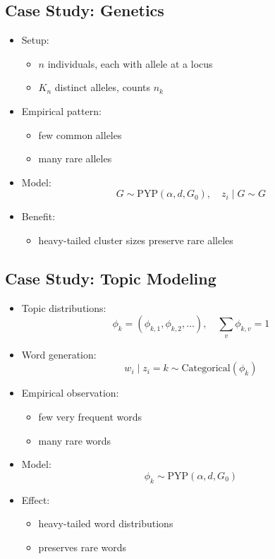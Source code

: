 \documentclass[12pt,oneside]{book}
\numberwithin{equation}{section}
\theoremstyle{definition}
\theoremstyle{plain}
\theoremstyle{remark}
\begin{document}
\subsection{Case Study: Genetics}

\begin{itemize}
\item Setup:
\begin{itemize}
\item $n$ individuals, each with allele at a locus
\item $K_n$ distinct alleles, counts $n_k$
\end{itemize}

\item Empirical pattern:
\begin{itemize}
\item few common alleles
\item many rare alleles
\end{itemize}

\item Model:
\[
G \sim \text{PYP}(\alpha, d, G_0), \quad z_i \mid G \sim G
\]

\item Benefit:
\begin{itemize}
\item heavy-tailed cluster sizes preserve rare alleles
\end{itemize}
\end{itemize}

\subsection{Case Study: Topic Modeling}

\begin{itemize}
\item Topic distributions:
\[
\phi_k = (\phi_{k,1}, \phi_{k,2}, \dots), \quad \sum_v \phi_{k,v} = 1
\]

\item Word generation:
\[
w_i \mid z_i = k \sim \text{Categorical}(\phi_k)
\]

\item Empirical observation:
\begin{itemize}
\item few very frequent words
\item many rare words
\end{itemize}

\item Model:
\[
\phi_k \sim \text{PYP}(\alpha, d, G_0)
\]

\item Effect:
\begin{itemize}
\item heavy-tailed word distributions
\item preserves rare words
\end{itemize}
\end{itemize}
\end{document}
